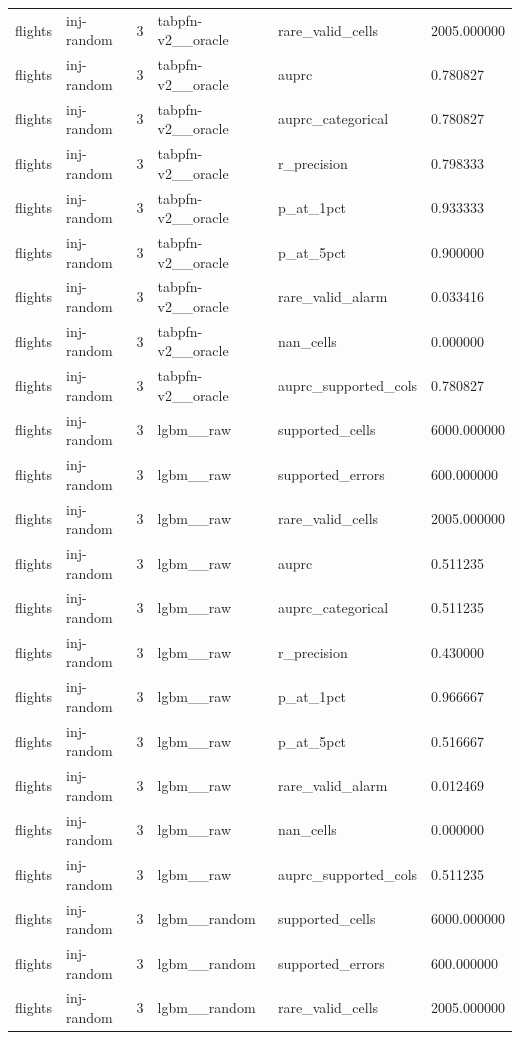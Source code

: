 \begin{tabular}{llllll}
flights & inj-random & 3 & tabpfn-v2\_\_oracle & rare\_valid\_cells & 2005.000000 \\
flights & inj-random & 3 & tabpfn-v2\_\_oracle & auprc & 0.780827 \\
flights & inj-random & 3 & tabpfn-v2\_\_oracle & auprc\_categorical & 0.780827 \\
flights & inj-random & 3 & tabpfn-v2\_\_oracle & r\_precision & 0.798333 \\
flights & inj-random & 3 & tabpfn-v2\_\_oracle & p\_at\_1pct & 0.933333 \\
flights & inj-random & 3 & tabpfn-v2\_\_oracle & p\_at\_5pct & 0.900000 \\
flights & inj-random & 3 & tabpfn-v2\_\_oracle & rare\_valid\_alarm & 0.033416 \\
flights & inj-random & 3 & tabpfn-v2\_\_oracle & nan\_cells & 0.000000 \\
flights & inj-random & 3 & tabpfn-v2\_\_oracle & auprc\_supported\_cols & 0.780827 \\
flights & inj-random & 3 & lgbm\_\_raw & supported\_cells & 6000.000000 \\
flights & inj-random & 3 & lgbm\_\_raw & supported\_errors & 600.000000 \\
flights & inj-random & 3 & lgbm\_\_raw & rare\_valid\_cells & 2005.000000 \\
flights & inj-random & 3 & lgbm\_\_raw & auprc & 0.511235 \\
flights & inj-random & 3 & lgbm\_\_raw & auprc\_categorical & 0.511235 \\
flights & inj-random & 3 & lgbm\_\_raw & r\_precision & 0.430000 \\
flights & inj-random & 3 & lgbm\_\_raw & p\_at\_1pct & 0.966667 \\
flights & inj-random & 3 & lgbm\_\_raw & p\_at\_5pct & 0.516667 \\
flights & inj-random & 3 & lgbm\_\_raw & rare\_valid\_alarm & 0.012469 \\
flights & inj-random & 3 & lgbm\_\_raw & nan\_cells & 0.000000 \\
flights & inj-random & 3 & lgbm\_\_raw & auprc\_supported\_cols & 0.511235 \\
flights & inj-random & 3 & lgbm\_\_random & supported\_cells & 6000.000000 \\
flights & inj-random & 3 & lgbm\_\_random & supported\_errors & 600.000000 \\
flights & inj-random & 3 & lgbm\_\_random & rare\_valid\_cells & 2005.000000 \\

\end{tabular}
